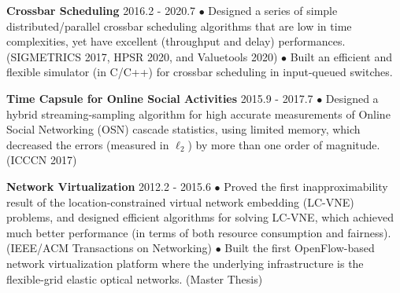 \documentclass[line,11pt,letter]{includes/cls/myRes}
\begin{document}
\begin{resume}
{\setlength{\parskip}{0pt}
{\bf Crossbar Scheduling} \hfill 2016.2 - 2020.7\break
{\hspace*{1em} $\bullet$ Designed a series of simple distributed/parallel crossbar scheduling algorithms that are low in time complexities, yet have excellent (throughput and delay) performances. (SIGMETRICS 2017, HPSR 2020, and Valuetools 2020)\hfill\break}
{\hspace*{1em} $\bullet$ Built an efficient and flexible simulator (in C/C++) for crossbar scheduling in input-queued switches.\hfill\break}
\sspace
}

{\setlength{\parskip}{0pt}
{\bf Time Capsule for Online Social Activities} \hfill 2015.9 - 2017.7 \break
{\hspace*{1em} $\bullet$ Designed a hybrid streaming-sampling algorithm for high accurate measurements of Online Social Networking (OSN) cascade statistics, using limited memory, which decreased the errors (measured in $\ell_2$) by more than one order of magnitude. (ICCCN 2017)\hfill\break}
\sspace
}

{\setlength{\parskip}{0pt}
{\bf Network Virtualization} \hfill 2012.2 - 2015.6\break
{\hspace*{1em} $\bullet$ Proved the first inapproximability result of the location-constrained virtual network embedding (LC-VNE) problems, and designed efficient algorithms for solving LC-VNE, which achieved much better performance (in terms of both resource consumption and fairness). (IEEE/ACM Transactions on Networking)\hfill\break}
{\hspace*{1em} $\bullet$ Built the first OpenFlow-based network virtualization platform where the underlying infrastructure is the flexible-grid elastic optical networks. (Master Thesis)\hfill\break}
}
\negspace

\end{resume}
\end{document}
